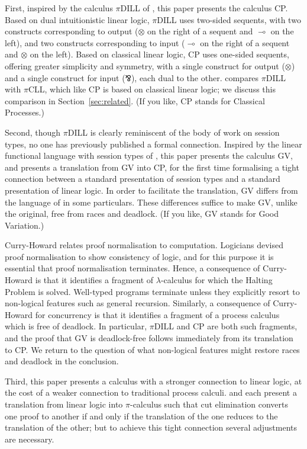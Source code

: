\documentclass{jfp1}
\newcommand{\parr}{\mathbin{\bindnasrepma}}
\newcommand{\lolli}{\multimap}
\begin{document}
First, inspired by the calculus $\pi$DILL of \cite{CairesPfenning10},
this paper presents the calculus CP.  Based on dual intuitionistic linear
logic, $\pi$DILL uses two-sided sequents, with two constructs
corresponding to output ($\otimes$ on the right of a sequent and
$\lolli$ on the left), and two constructs corresponding to input
($\lolli$ on the right of a sequent and $\otimes$ on the left).  Based
on classical linear logic, CP uses one-sided sequents, offering
greater simplicity and symmetry, with a single construct for output
($\otimes$) and a single construct for input ($\parr$), each dual to
the other.  \citet{CairesEtAl12} compares $\pi$DILL with $\pi$CLL,
which like CP is based on classical linear logic; we discuss this
comparison in Section~\ref{sec:related}.
(If you like, CP stands for Classical Processes.)

Second, though $\pi$DILL is clearly reminiscent of the body of work on
session types, no one has previously published a formal connection.
Inspired by the linear functional language with session types of
\cite{GayVasconcelos10}, this paper presents the calculus GV, and
presents a translation from GV into CP, for the first time formalising
a tight connection between a standard presentation of session types
and a standard presentation of linear logic.
In order to facilitate the translation, GV differs
from the language of \cite{GayVasconcelos10} in some particulars.
These differences suffice to make GV, unlike the original, free from
races and deadlock.  (If you like, GV stands for Good Variation.)

Curry-Howard relates proof normalisation to computation.  Logicians
devised proof normalisation to show consistency of logic, and for this
purpose it is essential that proof normalisation terminates.  Hence,
a consequence of Curry-Howard is that it identifies a fragment of
$\lambda$-calculus for which the Halting Problem is solved.
Well-typed programs terminate unless they explicitly resort to
non-logical features such as general recursion.  Similarly, a
consequence of Curry-Howard for concurrency is that it identifies a
fragment of a process calculus which is free of deadlock.  In
particular, $\pi$DILL and CP are both such fragments, and the proof
that GV is deadlock-free follows immediately from its translation
to CP.  We return to the question of what non-logical features might
restore races and deadlock in the conclusion.

Third, this paper presents a calculus with a stronger connection to
linear logic, at the cost of a weaker connection to traditional
process calculi.  \citet{BellinScott94} and \citet{CairesPfenning10}
each present a translation from linear logic into $\pi$-calculus such
that cut elimination converts one proof to another if and only if the
translation of the one reduces to the translation of the other; but to
achieve this tight connection several adjustments are necessary.
\end{document}

